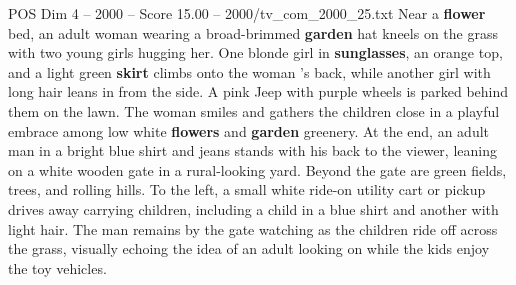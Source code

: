 \begin{textsample}{POS Dim 4 – 2000 – Score 15.00 – 2000/tv\_com\_2000\_25.txt}
Near a \textbf{flower} bed, an adult woman wearing a broad-brimmed \textbf{garden} hat kneels on the grass with two young girls hugging her.
One blonde girl in \textbf{sunglasses}, an orange top, and a light green \textbf{skirt} climbs onto the woman ’s back, while another girl with long hair leans in from the side.
A pink Jeep with purple wheels is parked behind them on the lawn.
The woman smiles and gathers the children close in a playful embrace among low white \textbf{flowers} and \textbf{garden} greenery.
At the end, an adult man in a bright blue shirt and jeans stands with his back to the viewer, leaning on a white wooden gate in a rural-looking yard.
Beyond the gate are green fields, trees, and rolling hills.
To the left, a small white ride-on utility cart or pickup drives away carrying children, including a child in a blue shirt and another with light hair.
The man remains by the gate watching as the children ride off across the grass, visually echoing the idea of an adult looking on while the kids enjoy the toy vehicles.

\end{textsample}
